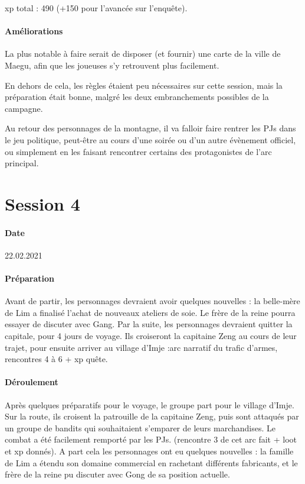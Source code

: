\documentclass[10pt,a4paper]{book}
\begin{document}
xp total : 490 (+150 pour l'avancée sur l'enquête).
\paragraph{Améliorations}
La plus notable à faire serait de disposer (et fournir) une carte de la ville de Maegu, afin que les joueuses s'y retrouvent plus facilement.

En dehors de cela, les règles étaient peu nécessaires sur cette session, mais la préparation était bonne, malgré les deux embranchements possibles de la campagne.

Au retour des personnages de la montagne, il va falloir faire rentrer les PJs dans le jeu politique, peut-être au cours d'une soirée ou d'un autre évènement officiel, ou simplement en les faisant rencontrer certains des protagonistes de l'arc principal.
\section{Session 4}
\paragraph{Date}22.02.2021
\paragraph{Préparation} Avant de partir, les personnages devraient avoir quelques nouvelles : la belle-mère de Lim a finalisé l'achat de nouveaux ateliers de soie. Le frère de la reine pourra essayer de discuter avec Gang. Par la suite, les personnages devraient quitter la capitale, pour 4 jours de voyage. Ils croiseront la capitaine Zeng au cours de leur trajet, pour ensuite arriver au village d'Imje :arc narratif du trafic d'armes, rencontres 4 à 6 + xp quête.
\paragraph{Déroulement}
Après quelques préparatifs pour le voyage, le groupe part pour le village d'Imje. Sur la route, ils croisent la patrouille de la capitaine Zeng, puis sont attaqués par un groupe de bandits qui souhaitaient s'emparer de leurs marchandises. Le combat a été facilement remporté par les PJs. (rencontre 3 de cet arc fait + loot et xp donnés). A part cela les personnages ont eu quelques nouvelles : la famille de Lim a étendu son domaine commercial en rachetant différents fabricants, et le frère de la reine pu discuter avec Gong de sa position actuelle.
\end{document}
